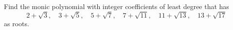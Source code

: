 Find the monic polynomial with integer coefficients of least degree that has
\[2+\sqrt3,\quad3+\sqrt5,\quad5+\sqrt7,\quad7+\sqrt{11},\quad11+\sqrt{13},\quad13+\sqrt{17}\]
as roots.

